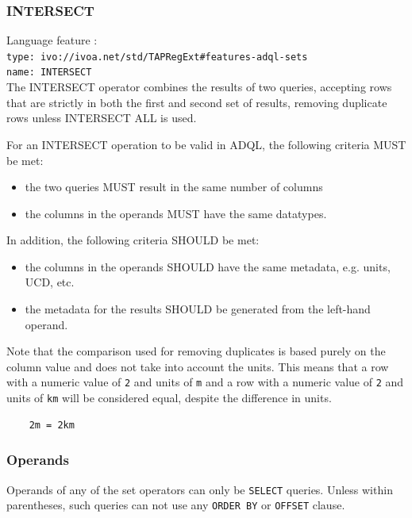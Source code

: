 \documentclass[11pt,a4paper]{ivoa}
\begin{document}
\subsubsection{INTERSECT}
{\footnotesize Language feature :}\\
{\footnotesize \verb|type: ivo://ivoa.net/std/TAPRegExt#features-adql-sets|}\\
{\footnotesize \verb|name: INTERSECT|}\\

The INTERSECT operator combines the results of two queries, accepting rows
that are strictly in both the first and second set of results,
removing duplicate rows unless INTERSECT ALL is used.

For an INTERSECT operation to be valid in ADQL, the following criteria MUST be met:

\begin{itemize}
    \item the two queries MUST result in the same number of columns
    \item the columns in the operands MUST have the same datatypes.
\end{itemize}

In addition, the following criteria SHOULD be met: 
\begin{itemize}
    \item the columns in the operands SHOULD have the same metadata, e.g. units, UCD, etc.
    \item the metadata for the results SHOULD be generated from the left-hand operand.
\end{itemize}

Note that the comparison used for removing duplicates is based purely on the
column value and does not take into account the units.
This means that a row with a numeric value of \verb:2: and units of \verb:m:
and a row with a numeric value of \verb:2: and units of \verb:km: will be
considered equal, despite the difference in units.
\begin{verbatim}
    2m = 2km
\end{verbatim}

\subsubsection{Operands}

Operands of any of the set operators can only be \verb:SELECT: queries.
Unless within parentheses, such queries can not use any \verb:ORDER BY: or
\verb:OFFSET: clause.
\end{document}
